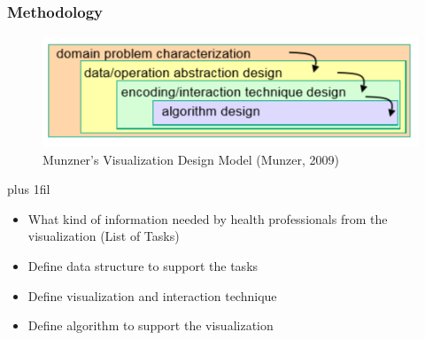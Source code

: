 \documentclass{beamer}
\makeatletter
\def\normaljustify{%
  \let\\\@centercr\rightskip\z@skip \leftskip\z@skip%
  \parfillskip=0pt plus 1fil}
\makeatother
\begin{document}
\begin{frame}
\frametitle{Methodology}
\centering
\begin{figure}
\includegraphics[scale=0.7]{images/munzner_model.png}
\caption{Munzner's Visualization Design Model (Munzer, 2009)}
\end{figure}

\normaljustify
\begin{itemize}
\item What kind of information needed by health professionals from the visualization (List of Tasks)
\item Define data structure to support the tasks
\item Define visualization and interaction technique
\item Define algorithm to support the visualization
\end{itemize}
\end{frame}

\end{document}
